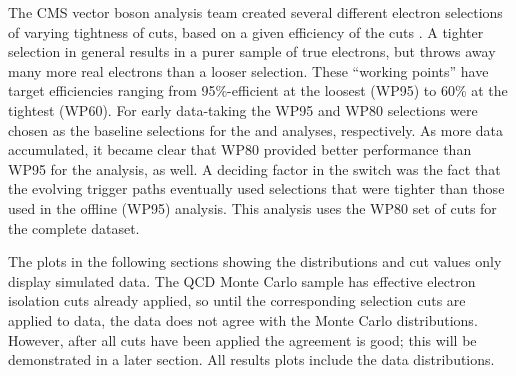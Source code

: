 The CMS vector boson analysis team created several different electron selections of varying tightness of cuts,
based on a given efficiency of the cuts \cite{CMSWZ}.  %
A tighter selection in general results in a purer sample of true electrons, but throws away many more
real electrons than a looser selection.  
These ``working points'' have target efficiencies ranging from 95\%-efficient at the loosest (WP95) to 60\% at the tightest (WP60).  
For early data-taking the WP95 and WP80 selections were chosen as the baseline selections for the \Zee and \Wenu analyses, respectively.
As more data accumulated, it became clear that WP80 provided better performance than WP95 for the \Zee analysis, as well.  
A deciding factor in the switch was the fact that the evolving trigger paths eventually used selections that were
tighter than those used in the offline (WP95) analysis.  
This analysis uses the WP80 set of cuts for the complete dataset.  

The plots in the following sections showing the distributions and cut values 
only display simulated data.  
The QCD Monte Carlo sample has effective electron isolation cuts already applied, 
so until the corresponding selection cuts are applied to data, 
the data does not agree with the Monte Carlo distributions.  
However, after all cuts have been applied the agreement is good; 
this will be demonstrated in a later section.  
All results plots include the data distributions.  



